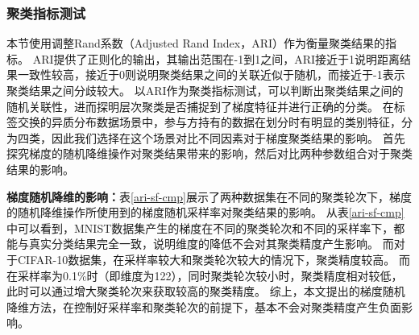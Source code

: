 \subsubsection{聚类指标测试}\label{hc-test}
本节使用调整Rand系数（Adjusted Rand Index，ARI）\cite{hubert1985comparing}作为衡量聚类结果的指标。
ARI提供了正则化的输出，其输出范围在-1到1之间，ARI接近于1说明距离结果一致性较高，接近于0则说明聚类结果之间的关联近似于随机，而接近于-1表示聚类结果之间分歧较大。
以ARI作为聚类指标测试，可以判断出聚类结果之间的随机关联性，进而探明层次聚类是否捕捉到了梯度特征并进行正确的分类。
在标签交换的异质分布数据场景中，参与方持有的数据在划分时有明显的类别特征，分为四类，因此我们选择在这个场景对比不同因素对于梯度聚类结果的影响。
首先探究梯度的随机降维操作对聚类结果带来的影响，然后对比两种参数组合对于聚类结果的影响。

\textbf{梯度随机降维的影响：}表\ref{ari-sf-cmp}展示了两种数据集在不同的聚类轮次下，梯度的随机降维操作所使用到的梯度随机采样率对聚类结果的影响。
从表\ref{ari-sf-cmp}中可以看到，MNIST数据集产生的梯度在不同的聚类轮次和不同的采样率下，都能与真实分类结果完全一致，说明维度的降低不会对其聚类精度产生影响。
而对于CIFAR-10数据集，在采样率较大和聚类轮次较大的情况下，聚类精度较高。
而在采样率为0.1\%时（即维度为122），同时聚类轮次较小时，聚类精度相对较低，此时可以通过增大聚类轮次来获取较高的聚类精度。
综上，本文提出的梯度随机降维方法，在控制好采样率和聚类轮次的前提下，基本不会对聚类精度产生负面影响。

\begin{table}[]
	\centering
	\caption{不同梯度随机采样率ARI对比}
	\label{ari-sf-cmp}
\end{table}

